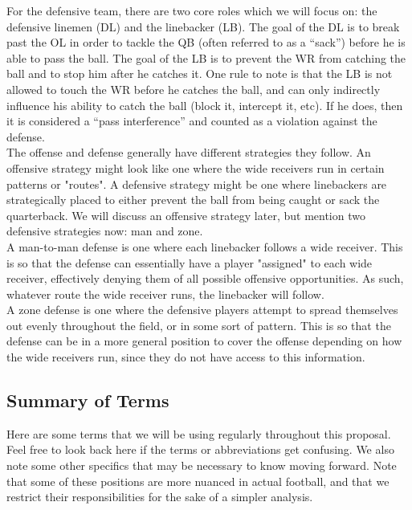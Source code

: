 For the defensive team, there are two core roles which we will focus on: the defensive linemen (DL) and the linebacker (LB). The goal of the DL is to break past the OL in order to tackle the QB (often referred to as a “sack”) before he is able to pass the ball. The goal of the LB is to prevent the WR from catching the ball and to stop him after he catches it. One rule to note is that the LB is not allowed to touch the WR before he catches the ball, and can only indirectly influence his ability to catch the ball (block it, intercept it, etc). If he does, then it is considered a “pass interference” and counted as a violation against the defense. \\

The offense and defense generally have different strategies they follow. An offensive strategy might look like one where the wide receivers run in certain patterns or "routes". A defensive strategy might be one where linebackers are strategically placed to either prevent the ball from being caught or sack the quarterback. We will discuss an offensive strategy later, but mention two defensive strategies now: man and zone. \\ 

A man-to-man defense is one where each linebacker follows a wide receiver. This is so that the defense can essentially have a player "assigned" to each wide receiver, effectively denying them of all possible offensive opportunities. As such, whatever route the wide receiver runs, the linebacker will follow.\\

A zone defense is one where the defensive players attempt to spread themselves out evenly throughout the field, or in some sort of pattern. This is so that the defense can be in a more general position to cover the offense depending on how the wide receivers run, since they do not have access to this information. 

\subsection{Summary of Terms}

\quad Here are some terms that we will be using regularly throughout this proposal. Feel free to look back here if the terms or abbreviations get confusing. We also note some other specifics that may be necessary to know moving forward. Note that some of these positions are more nuanced in actual football, and that we restrict their responsibilities for the sake of a simpler analysis.

